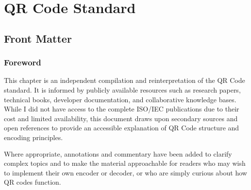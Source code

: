\documentclass[../../2_specs]{subfiles}
\begin{document}
\chapter{QR Code Standard}

\section{Front Matter}

\subsection{Foreword}




This chapter is an independent compilation and reinterpretation of the QR Code standard. 
It is informed by publicly available resources such as research papers, technical books, developer documentation, and collaborative knowledge bases. 
While I did not have access to the complete ISO/IEC publications due to their cost and limited availability, this document draws upon secondary sources and open references to provide an accessible explanation of QR Code structure and encoding principles.  

Where appropriate, annotations and commentary have been added to clarify complex topics and to make the material approachable for readers who may wish to implement their own encoder or decoder, or who are simply curious about how QR codes function.  
\end{document}
